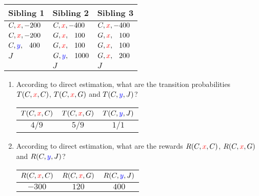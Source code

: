\documentclass[12pt]{article}
\begin{document}
\begin{enumerate}
\begin{center}
\begin{tabular}{|l|l|l|} \hline
{\bf Sibling 1} & {\bf Sibling 2} & {\bf Sibling 3} \\ \hline
$C, {\color{red}{x}}, -200$ & $C, {\color{red}{x}}, -400$ & $C, {\color{red}{x}}, -400$ \\
$C, {\color{red}{x}}, -200$ & $G, {\color{red}{x}},  \phantom{-}100$ & $G, {\color{red}{x}},  \phantom{-}100$ \\
$C, {\color{blue}{y}}, \phantom{-}400$ & $G, {\color{red}{x}},  \phantom{-}100$ & $G, {\color{red}{x}},  \phantom{-}100$ \\
$J$          & $G, {\color{blue}{y}}, \phantom{-}1000$ & $G, {\color{red}{x}},  \phantom{-}200$ \\
             & $J$          & $J$          \\ \hline
\end{tabular}
\end{center}

  \begin{enumerate}

  \item According to direct estimation, what are the transition
    probabilities $T(C,{\color{red}{x}},C)$, $T(C,{\color{red}{x}},G)$ and $T(C,{\color{blue}{y}},J)$?

    \begin{table}[H]
      \centering
      \begin{tabular}{c c c}
        \hline\hline
        $T(C,{\color{red}{x}},C)$ & $T(C,{\color{red}{x}},G)$ & $T(C,{\color{blue}{y}},J)$\\
        \hline
        $4/9$ & $5/9$ & $1/1$\\
        \hline
       \end{tabular}
      \end{table}

  \item According to direct estimation, what are the rewards
    $R(C,{\color{red}{x}},C)$, $R(C,{\color{red}{x}},G)$ and $R(C,{\color{blue}{y}},J)$?


    \begin{table}[H]
      \centering
      \begin{tabular}{c c c}
        \hline\hline
        $R(C,{\color{red}{x}},C)$ & $R(C,{\color{red}{x}},G)$ & $R(C,{\color{blue}{y}},J)$\\
        \hline
        $-300$ & $120$ & $400$\\
        \hline
       \end{tabular}
      \end{table}



\end{enumerate}
\end{enumerate}
\end{document}
